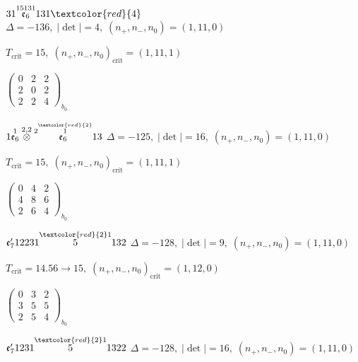 \documentclass[10pt]{article}
\begin{document}
$31\overset{15131}{\mathfrak{e}_6}131\textcolor{red}{4}$ \quad $\Delta=-136,\; |\det|=4,\; (n_+,n_-,n_0)=(1,11,0)$

\hspace{1em}$T_{\text{crit}}=15,\; (n_+,n_-,n_0)_{\text{crit}}=(1,11,1)$

\hspace{2em}$\left(\begin{smallmatrix}0 & 2 & 2 \\ 2 & 0 & 2 \\ 2 & 2 & 4\end{smallmatrix}\right)_{\!b_0}$

\smallskip

$1\overset{1}{\mathfrak{e}_6}\overset{2,2}{\otimes}\overset{2\overset{\textcolor{red}{2}}{1}}{\mathfrak{e}_6}13$ \quad $\Delta=-125,\; |\det|=16,\; (n_+,n_-,n_0)=(1,11,0)$

\hspace{1em}$T_{\text{crit}}=15,\; (n_+,n_-,n_0)_{\text{crit}}=(1,11,1)$

\hspace{2em}$\left(\begin{smallmatrix}0 & 4 & 2 \\ 4 & 8 & 6 \\ 2 & 6 & 4\end{smallmatrix}\right)_{\!b_0}$

\smallskip

$\mathfrak{e}_7'12231\overset{\textcolor{red}{2}1}{5}132$ \quad $\Delta=-128,\; |\det|=9,\; (n_+,n_-,n_0)=(1,11,0)$

\hspace{1em}$T_{\text{crit}}=14.56 \to 15,\; (n_+,n_-,n_0)_{\text{crit}}=(1,12,0)$

\hspace{2em}$\left(\begin{smallmatrix}0 & 3 & 2 \\ 3 & 5 & 5 \\ 2 & 5 & 4\end{smallmatrix}\right)_{\!b_0}$

\smallskip

$\mathfrak{e}_7'1231\overset{\textcolor{red}{2}1}{5}1322$ \quad $\Delta=-128,\; |\det|=16,\; (n_+,n_-,n_0)=(1,11,0)$
\end{document}
